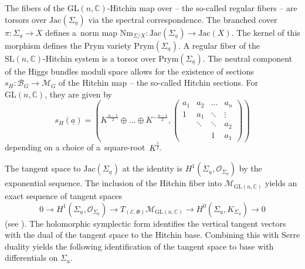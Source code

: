 \documentclass[10pt,a4paper]{amsart}
\numberwithin{equation}{section}
\theoremstyle{definition}
\newcommand{\reg}{\mathrm{reg}}
\newcommand{\Jac}{\mathrm{Jac}}
\renewcommand{\to}{\rightarrow}
\newcommand{\calB}{\mathcal{B}}
\newcommand{\calE}{\mathcal{E}}
\newcommand{\calM}{\mathcal{M}}
\newcommand{\calO}{\mathcal{O}}
\newcommand{\CC}{\mathbb{C}}
\newcommand{\Prym}{\mathrm{Prym}}
\newcommand{\Nm}{\mathrm{Nm}}
\newcommand{\GL}{\mathrm{GL}}
\newcommand{\SL}{\mathrm{SL}}
\begin{document}
The fibers of the $\GL(n,\CC)$-Hitchin map over \smash{$\calB_{\GL(n,\CC)}^{\reg}$} -- the so-called regular fibers -- are torsors over $\Jac(\Sigma_{\underline{a}})$ via the spectral correspondence. The branched cover $\pi\colon \Sigma_{\underline{a}} \to X$ defines a~norm map $\Nm_{\Sigma/X}\colon \Jac(\Sigma_{\underline{a}}) \to \Jac(X)$. The kernel of this morphism defines the Prym variety $\Prym(\Sigma_{\underline{a}})$. A regular fiber of the $\SL(n,\CC)$-Hitchin system is a torsor over $\Prym(\Sigma_{\underline{a}})$. The neutral component of the Higgs bundles moduli space allows for the existence of sections $s_H\colon \calB_G \to \calM_G$ of the Hitchin map -- the so-called Hitchin sections. For $\GL(n,\CC)$, they are given by
\[ s_H(\underline{a})=\left( K^{\frac{n-1}{2}} \oplus \dots \oplus K^{-\frac{n-1}{2}}, \begin{pmatrix} a_1 & a_2 & \dots & a_n \\ 1 & a_1 & \ddots & \vdots \\ & \ddots & \ddots & a_2 \\ &&1& a_1 \end{pmatrix} \right)
\] depending on a choice of a~square-root~$K^{\frac{1}{2}}$.

The tangent space to $\Jac(\Sigma_{\underline{a}})$ at the identity is $H^1(\Sigma_{\underline{a}},\calO_{\Sigma_{\underline{a}}})$ by the exponential sequence. The inclusion of the Hitchin fiber into $\calM_{\GL(n,\CC)}$ yields an exact sequence of tangent spaces
\[ 0 \to H^1(\Sigma_{\underline{a}},\calO_{\Sigma_{\underline{a}}}) \to T_{(\calE,\Phi)}\calM_{\GL(n,\CC)} \to H^0(\Sigma_{\underline{a}},K_{\Sigma_{\underline{a}}}) \to 0
\]
(see \cite[Proposition~8.2]{Markman}).
The holomorphic symplectic form identifies the vertical tangent vectors with the dual of the tangent space to the Hitchin base. Combining this with Serre duality yields the following identification of the tangent space to base with differentials on $\Sigma_{\underline{a}}$.
\end{document}
